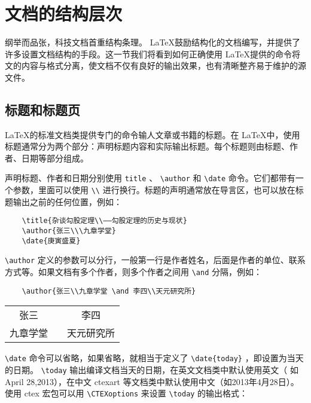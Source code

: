 \section{文档的结构层次}

纲举而品张，科技文档首重结构条理。 \LaTeX 鼓励结构化的文档编写，并提供了许多设置文档结构的手段。这一节我们将看到如何正确使用 \LaTeX 提供的命令将文的内容与格式分离，使文档不仅有良好的输出效果，也有清晰整齐易于维护的源文件。

\subsection{标题和标题页}

\LaTeX 的标准文档类提供专门的命令输人文章或书籍的标题。在 \LaTeX 中，使用标题通常分为两个部分：声明标题内容和实际输出标题。每个标题则由标题、作者、日期等部分组成。

声明标题、作者和日期分别使用 \verb|title| 、 \verb|\author| 和 \verb|\date| 命令。它们都带有一个参数，里面可以使用 \verb|\\| 进行换行。标题的声明通常放在导言区，也可以放在标题输出之前的任何位置，例如：
\begin{lstlisting}
    \title{杂谈勾股定理\\——勾股定理的历史与现状}
    \author{张三\\\九章学堂}
    \date{庚寅盛夏}
\end{lstlisting}   

\verb|\author| 定义的参数可以分行，一般第一行是作者姓名，后面是作者的单位、联系方式等。如果文档有多个作者，则多个作者之间用 \verb|\and| 分隔，例如：
\begin{lstlisting}
    \author{张三\\九章学堂 \and 李四\\天元研究所}
\end{lstlisting}

\begin{table}[H]
    \centering
    \begin{tabular}{ccc}
        张三 && 李四 \\ 
        九章学堂 && 天元研究所 \\
    \end{tabular}
\end{table}

\verb|\date| 命令可以省略，如果省略，就相当于定义了 \verb|\date{today}| ，即设置为当天的日期。 \verb|\today| 输出编译文档当天的日期，在英文文档类中默认使用英文（ 如 April 28,2013），在中文 ctexart 等文档类中默认使用中文（如2013年4月28日）。使用 ctex
宏包可以用 \verb|\CTEXoptions| 来设置 \verb|\today| 的输出格式：

